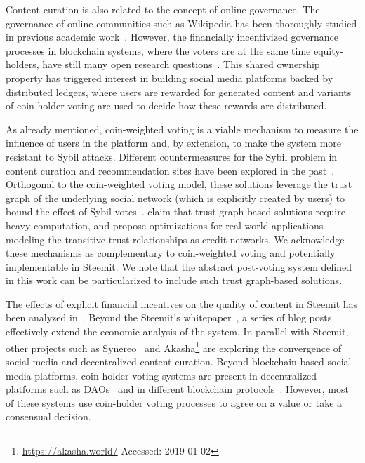 \documentclass[a4paper,english,cleveref, autoref]{oasics-v2019}
\begin{document}
  Content curation is also related to the concept of online governance. The
  governance of online communities such as Wikipedia has been thoroughly studied
  in previous academic work~\cite{leskovec2010governance,forte2008scaling}.
  However, the financially incentivized governance processes in blockchain
  systems, where the voters are at the same time equity-holders, have still many
  open research questions~\cite{vitalik,ehrsam}. This shared ownership property
  has triggered interest in building social media platforms backed by
  distributed ledgers, where users are rewarded for generated content and
  variants of coin-holder voting are used to decide how these rewards are
  distributed.

  As already mentioned, coin-weighted voting is a viable mechanism to measure
  the influence of users in the platform and, by extension, to make the system
  more resistant to Sybil attacks. Different countermeasures for the Sybil
  problem in content curation and recommendation sites have been explored in the
  past~\cite{molavi2013iolaus,tran2009sybil,yu2009dsybil,meo2017using}.
  Orthogonal to the coin-weighted voting model, these solutions leverage the
  trust graph of the underlying social network (which is explicitly created by
  users) to bound the effect of Sybil
  votes~\cite{molavi2013iolaus,tran2009sybil,yu2009dsybil}.
  \cite{viswanath2012canal} claim that trust graph-based solutions require heavy
  computation, and propose optimizations for real-world applications modeling
  the transitive trust relationships as credit networks. We acknowledge these
  mechanisms as complementary to coin-weighted voting and potentially
  implementable in Steemit. We note that the abstract post-voting system defined
  in this work can be particularized to include such trust graph-based
  solutions.

  The effects of explicit financial incentives on the quality of content in
  Steemit has been analyzed in~\cite{thelwall2017can}. Beyond the Steemit's
  whitepaper~\cite{steemit}, a series of blog
  posts~\cite{curationRewards,selfvoters} effectively extend the economic
  analysis of the system. In parallel with Steemit, other projects such as
  Synereo~\cite{synereo} and Akasha\footnote{\url{https://akasha.world/}
  Accessed: 2019-01-02} are exploring the convergence of social media and
  decentralized content curation. Beyond blockchain-based social media
  platforms, coin-holder voting systems are present in decentralized platforms
  such as DAOs~\cite{darkdaos} and in different blockchain
  protocols~\cite{dash,tezos}. However, most of these systems use coin-holder
  voting processes to agree on a value or take a consensual decision.
\end{document}
